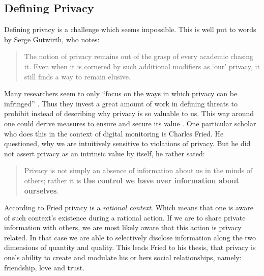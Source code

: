 \subsection{Defining Privacy}


Defining privacy is a challenge which seems impossible. This is well put to words by Serge Gutwirth, who notes:

\begin{quote}
The notion of privacy remains out of the grasp of every academic chasing it. Even when it is cornered by such additional modifiers as `our' privacy, it still finds a way to remain elusive. \cite{Gutwirth}
\end{quote}


Many researchers seem to only ``focus on the ways in which privacy can be infringed'' \cite{7ToP}.
Thus they invest a great amount of work in defining threats to prohibit instead of describing why privacy is so valuable to us.
This way around one could derive measures to ensure and secure its value \cite{7ToP}.
One particular scholar who does this in the context of digital monitoring is Charles Fried.
He questioned, why we are intuitively sensitive to violations of privacy.
But he did not assert privacy as an intrinsic value by itself, he rather sated:

\begin{quote}
Privacy is not simply an absence of information about us in the minds of others;
rather it is \textbf{the control we have over information about ourselves}. \cite{CFried:Privacy}
\end{quote}

According to Fried privacy is a \textit{rational context}.
Which means that one is aware of such context's existence during a rational action.
If we are to share private information with others, we are most likely aware that this action is privacy related.
In that case we are able to selectively disclose information along the two dimensions of quantity and quality.
This leads Fried to his thesis, that privacy is one's ability to create and modulate his or hers social relationships, namely: friendship, love and trust. \cite{CFried:Privacy}

